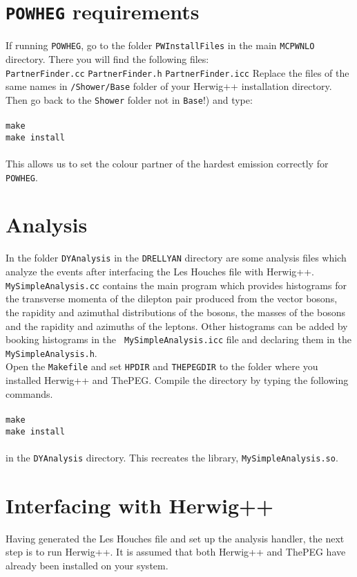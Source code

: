 \documentclass[12pt,a4paper,oneside]{article}
\begin{document}
{\section{{\tt POWHEG} requirements}
If running {\tt POWHEG}, go to the folder {\tt PWInstallFiles} in the main {\tt MCPWNLO}
directory. There you will find the following files:\\
{\tt PartnerFinder.cc}  {\tt PartnerFinder.h}  {\tt PartnerFinder.icc}
Replace the files of the same names in {\tt /Shower/Base} folder of your \textsf{Herwig++}
installation directory. Then go back to the {\tt Shower} folder not in {\tt Base}!) and type: \\
\\
{\tt make} \\
{\tt make install} \\
\\
This allows us to set the colour partner of the hardest emission correctly for {\tt
  POWHEG}.
\section{Analysis} 

In the folder {\tt DYAnalysis} in the {\tt DRELLYAN} directory are some analysis files
which analyze the events after interfacing the Les Houches file with
\textsf{Herwig++}. \\
{\tt MySimpleAnalysis.cc} contains the main program which provides
histograms for the transverse momenta of the dilepton pair produced from the vector
bosons, the rapidity and azimuthal distributions of the bosons, the masses of the bosons and the rapidity and
azimuths of the leptons. Other histograms can be added by booking histograms in the {\tt
  MySimpleAnalysis.icc} file and declaring them in the {\tt MySimpleAnalysis.h}.\\
Open the {\tt Makefile} and set {\tt HPDIR} and
{\tt THEPEGDIR} to the folder where you installed \textsf{Herwig++} and
\textsf{ThePEG}. Compile the directory by typing the following commands. \\
\\
{\tt make} \\
{\tt make install} \\
\\
in the {\tt DYAnalysis} directory. This recreates the library, {\tt MySimpleAnalysis.so}.

\section{Interfacing with \textsf{Herwig++}}
Having generated the Les Houches file and set up the analysis handler, the next step is to
run \textsf{Herwig++}. It is assumed that both \textsf{Herwig++} and \textsf{ThePEG} have
already been installed on your system. 

}
\end{document}
